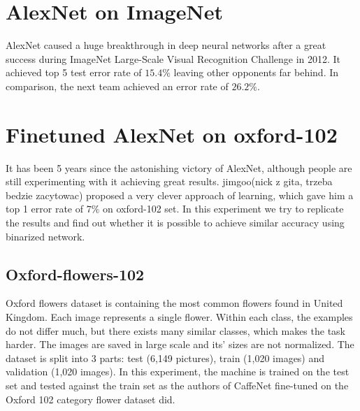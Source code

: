 \documentclass[licencjacka]{pracamgr}
\begin{document}
	\section{AlexNet on ImageNet}
	AlexNet caused a huge breakthrough in deep neural networks after a great success during ImageNet Large-Scale Visual Recognition Challenge in 2012. It achieved top 5 test error rate of $15.4\%$ leaving other opponents far behind. In comparison, the next team achieved an error rate of $26.2\%$. 
	\section{Finetuned AlexNet on oxford-102}
	It has been 5 years since the astonishing victory of AlexNet, although people are still experimenting with it achieving great results. jimgoo(nick z gita, trzeba bedzie zacytowac) proposed a very clever approach of learning, which gave him a top 1 error rate of $7\%$ on oxford-102 set. In this experiment we try to replicate the results and find out whether it is possible to achieve similar accuracy using binarized network. 
		\subsection{Oxford-flowers-102}
			Oxford flowers dataset is containing the most common flowers found in United Kingdom. Each image represents a single flower. Within each class, the examples do not differ much, but there exists many similar classes, which makes the task harder. The images are saved in large scale and its’ sizes are not normalized. The dataset is split into 3 parts: test (6,149 pictures), train (1,020 images) and validation (1,020 images). In this experiment, the machine is trained on the test set and tested against the train set as the authors of CaffeNet fine-tuned on the Oxford 102 category flower dataset did.
\end{document}
